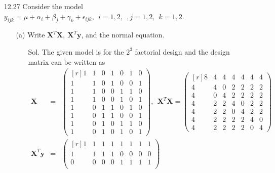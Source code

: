 \documentclass[12pt]{article} %
\begin{document}
\begin{enumerate}
\begin{itemize}
   \end{itemize}
   \item[12.27] Consider the model $y_{ijk}=\mu+\alpha_{i}+\beta_{j}+\gamma_{k}+\epsilon_{ijk},
   ~~i=1,2,~~,j=1,2,~~k=1,2.$
	   \begin{itemize}
	   \item[(a)] Write $\mathbf{X}^{T}\mathbf{X},~\mathbf{X}^{T}\mathbf{y}$, and the normal equation.
	      \begin{itemize}
		    \item[Sol.] The given model is for the $2^{3}$ factorial design and the design matrix can be written as		    
		    \begin{eqnarray*}
		    \mathbf{X}&=&
		    \begin{pmatrix}[r]
			    1 &   1 &   0 &   1 &   0 &   1 &   0 \\
			    1 &   1 &   0 &   1 &   0 &   0 &   1 \\ 
			    1 &   1 &   0 &   0 &   1 &   1 &   0 \\
			    1 &   1 &   0 &   0 &   1 &   0 &   1 \\
			    1 &   0 &   1 &   1 &   0 &   1 &   0 \\
			    1 &   0 &   1 &   1 &   0 &   0 &   1 \\
			    1 &   0 &   1 &   0 &   1 &   1 &   0 \\
			    1 &   0 &   1 &   0 &   1 &   0 &   1
			\end{pmatrix},~~
			\mathbf{X}^{T}\mathbf{X}=
			\begin{pmatrix}[r]
			    8 &   4 &   4 &   4 &   4 &   4 &   4 \\
			    4 &   4 &   0 &   2 &   2 &   2 &   2 \\
			    4 &   0 &   4 &   2 &   2 &   2 &   2 \\
			    4 &   2 &   2 &   4 &   0 &   2 &   2 \\
			    4 &   2 &   2 &   0 &   4 &   2 &   2 \\
			    4 &   2 &   2 &   2 &   2 &   4 &   0 \\
			    4 &   2 &   2 &   2 &   2 &   0 &   4
			\end{pmatrix} \\			
			\mathbf{X}^{T}\mathbf{y} &=&
			\begin{pmatrix}[r]
			    1 &   1 &   1 &   1 &   1 &   1 &   1 &   1 \\
			    1 &   1 &   1 &   1 &   0 &   0 &   0 &   0 \\
			    0 &   0 &   0 &   0 &   1 &   1 &   1 &   1 \\

\end{pmatrix}
\end{eqnarray*}
\end{itemize}
\end{itemize}
\end{enumerate}
\end{document}
